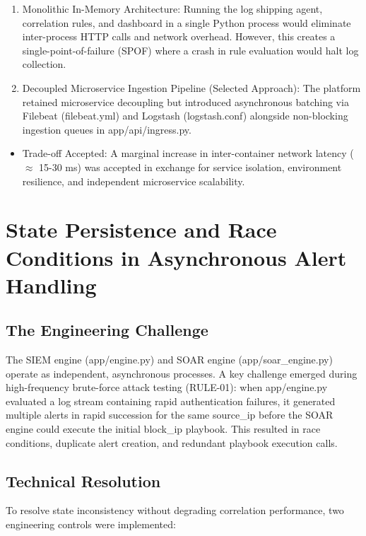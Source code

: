 \begin{enumerate}
  \item Monolithic In-Memory Architecture: Running the log shipping agent, correlation rules, and dashboard in a single Python process would eliminate inter-process HTTP calls and network overhead. However, this creates a single-point-of-failure (SPOF) where a crash in rule evaluation would halt log collection.
  \item Decoupled Microservice Ingestion Pipeline (Selected Approach): The platform retained microservice decoupling but introduced asynchronous batching via Filebeat (filebeat.yml) and Logstash (logstash.conf) alongside non-blocking ingestion queues in app/api/ingress.py.
\end{enumerate}

\begin{itemize}
  \item Trade-off Accepted: A marginal increase in inter-container network latency ($\approx$ 15-30 ms) was accepted in exchange for service isolation, environment resilience, and independent microservice scalability.
\end{itemize}

\section{State Persistence and Race Conditions in Asynchronous Alert Handling}

\subsection{The Engineering Challenge}

The SIEM engine (app/engine.py) and SOAR engine (app/soar\_engine.py) operate as independent, asynchronous processes. A key challenge emerged during high-frequency brute-force attack testing (RULE-01): when app/engine.py evaluated a log stream containing rapid authentication failures, it generated multiple alerts in rapid succession for the same source\_ip before the SOAR engine could execute the initial block\_ip playbook. This resulted in race conditions, duplicate alert creation, and redundant playbook execution calls.

\subsection{Technical Resolution}

To resolve state inconsistency without degrading correlation performance, two engineering controls were implemented:

